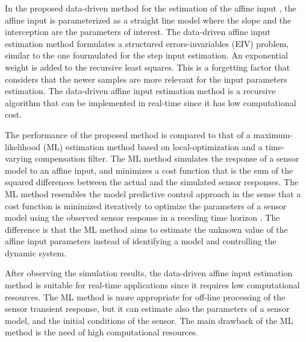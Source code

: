 In the proposed data-driven method for the estimation of the affine input \citep{QuintanaMEAS},
the affine input is parameterized as a straight line model where the slope and the interception are the parameters of interest.
The data-driven affine input estimation method formulates a structured errors-invariables (EIV) problem, similar to the one fourmulated for the step input estimation.
An exponential weight is added to the recursive least squares.
This is a forgetting factor that considers that the newer samples are more relevant for the input parameters estimation.
The data-driven affine input estimation method is a recursive algorithm that can be implemented in real-time since it has low computational cost.

The performance of the proposed method is compared to that of a maximum-likelihood (ML) estimation method based on local-optimization and a time-varying compensation filter.
The ML method simulates the response of a sensor model to an affine input, and minimizes a cost function that is the sum of the squared differences between the actual and the simulated sensor responses. 
The ML method resembles the model predictive control approach in the sense that a cost function is minimized iteratively to optimize the parameters of a sensor model using the observed sensor response in a receding time horizon \citep{Mayne14}.
The difference is that the ML method aims to estimate the unknown value of the affine input parameters instead of identifying a model and controlling the dynamic system. 
 
After observing the simulation results, the data-driven affine input estimation method is suitable for real-time applications since it requires low computational resources. 
The ML method is more appropriate for off-line processing of the sensor transient response, but
it can estimate also the parameters of a sensor model, and the initial conditions of the sensor.
The main drawback of the ML method is the need of high computational resources.


 
\newpage
